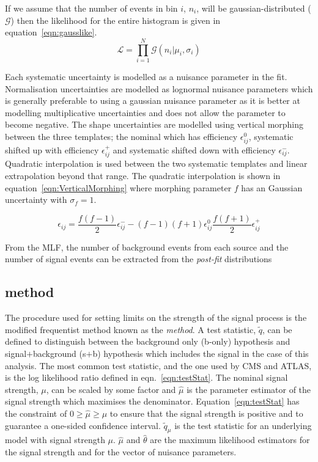 If we assume that the number of events in bin $i$, $n_{i}$, will be gaussian-distributed ($\mathcal{G}$) then the likelihood for the entire histogram is given in equation~\ref{eqn:gausslike}.
\begin{equation}
\mathcal{L} = \prod_{i=1}^{N} \mathcal{G}\left(n_{i}|\mu_{i},\sigma_{i}\right)
\label{eqn:gausslike}
\end{equation}

Each systematic uncertainty is modelled as a nuisance parameter in the fit. Normalisation uncertainties are modelled as lognormal nuisance parameters which is generally preferable to using a gaussian nuisance parameter as it is better at modelling multiplicative uncertainties and does not allow the parameter to become negative. The shape uncertainties are modelled using vertical morphing between the three templates; the nominal which has efficiency $\epsilon_{ij}^{0}$, systematic shifted up with efficiency $\epsilon_{ij}^{+}$ and systematic shifted down with efficiency $\epsilon_{ij}^{-}$. Quadratic interpolation is used between the two systematic templates and linear extrapolation beyond that range. The quadratic interpolation is shown in equation~\ref{eqn:VerticalMorphing} where morphing parameter $f$ has an Gaussian uncertainty with $\sigma_{f}=1$.

\begin{equation}
\epsilon_{ij} = \frac{f\left(f-1\right)}{2}\epsilon_{ij}^{-} - \left(f-1\right)\left(f+1\right) \epsilon_{ij}^{0}  \frac{f\left(f+1\right)}{2}\epsilon_{ij}^{+}
\label{eqn:VerticalMorphing}
\end{equation}

From the MLF, the number of background events from each source and the number of signal events can be extracted from the \emph{post-fit} distributions

\subsection{\CLS method}

The procedure used for setting limits on the strength of the signal process is the modified frequentist method known as the \emph{\CLS method}.
A test statistic, $\tilde{q}$, can be defined to distinguish between the background only (b-only) hypothesis and signal$+$background (s$+$b) hypothesis which includes the \tttt signal in the case of this analysis. The most common test statistic, and the one used by CMS and ATLAS, is the log likelihood ratio defined in eqn.~\ref{eqn:testStat}. The nominal signal strength, $\mu$, can be scaled by some factor and $\hat{\mu}$ is the parameter estimator of the signal strength which maximises the denominator. Equation~\ref{eqn:testStat} has the constraint of $0\geq \hat{\mu}\geq \mu$ to ensure that the signal strength is positive and to guarantee a one-sided confidence interval. $\tilde{q}_{\mu}$ is the test statistic for an underlying model with signal strength $\mu$. $\hat{\mu}$ and $\hat{\theta}$ are the maximum likelihood estimators for the signal strength and for the vector of nuisance parameters.

